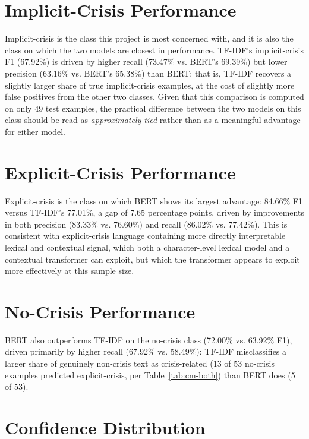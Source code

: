 \section{Implicit-Crisis Performance}
\label{sec:implicit-perf}

Implicit-crisis is the class this project is most concerned with, and it is also the class on which the two models are closest in performance. TF-IDF's implicit-crisis F1 (67.92\%) is driven by higher recall (73.47\% vs. BERT's 69.39\%) but lower precision (63.16\% vs. BERT's 65.38\%) than BERT; that is, TF-IDF recovers a slightly larger share of true implicit-crisis examples, at the cost of slightly more false positives from the other two classes. Given that this comparison is computed on only 49 test examples, the practical difference between the two models on this class should be read as \emph{approximately tied} rather than as a meaningful advantage for either model.

\section{Explicit-Crisis Performance}

Explicit-crisis is the class on which BERT shows its largest advantage: 84.66\% F1 versus TF-IDF's 77.01\%, a gap of 7.65 percentage points, driven by improvements in both precision (83.33\% vs. 76.60\%) and recall (86.02\% vs. 77.42\%). This is consistent with explicit-crisis language containing more directly interpretable lexical and contextual signal, which both a character-level lexical model and a contextual transformer can exploit, but which the transformer appears to exploit more effectively at this sample size.

\section{No-Crisis Performance}

BERT also outperforms TF-IDF on the no-crisis class (72.00\% vs. 63.92\% F1), driven primarily by higher recall (67.92\% vs. 58.49\%): TF-IDF misclassifies a larger share of genuinely non-crisis text as crisis-related (13 of 53 no-crisis examples predicted explicit-crisis, per Table~\ref{tab:cm-both}) than BERT does (5 of 53).

\section{Confidence Distribution}

